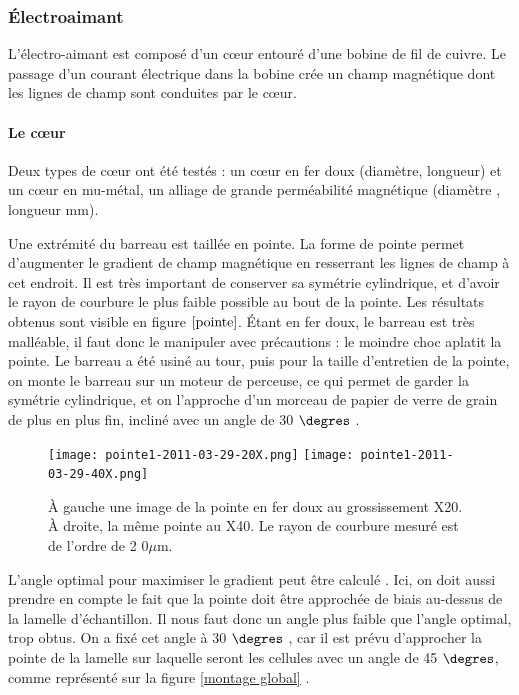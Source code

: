		\subsubsection{\'Electroaimant}
		L'électro-aimant est composé d'un c\oe ur entouré d'une bobine de fil de cuivre. Le passage d'un courant électrique dans la bobine crée un champ magnétique dont les lignes de champ sont conduites par le c\oe ur. 
		
		\paragraph{Le c\oe ur} Deux types de c\oe ur ont été testés : un c\oe ur en fer doux (diamètre, longueur) et un c\oe ur en mu-métal, un alliage de grande perméabilité magnétique (diamètre  , longueur mm).
		
		Une extrémité du barreau est taillée en pointe. La forme de pointe permet d'augmenter le gradient de champ magnétique en resserrant les lignes de champ à cet endroit. Il est très important de conserver sa symétrie cylindrique, et d'avoir le rayon de courbure le plus faible possible au bout de la pointe. Les résultats obtenus sont visible en figure $\ref{pointe}$. \'Etant en fer doux, le barreau est très malléable, il faut donc le manipuler avec précautions : le moindre choc aplatit la pointe. 
	 Le barreau a été usiné au tour, puis pour la taille d'entretien de la pointe, on monte le barreau sur un moteur de perceuse, ce qui permet de garder la symétrie cylindrique, et on l'approche d'un morceau de papier de verre de grain de plus en plus fin, incliné avec un angle de 30 $\degres$ .
	 
	 \begin{figure}[ht!]%
\texttt{[image: pointe1-2011-03-29-20X.png]}%
\texttt{[image: pointe1-2011-03-29-40X.png]}
\caption{À gauche une image de la pointe en fer doux au grossissement X20. À droite, la même pointe au X40. Le rayon de courbure mesuré est de l'ordre de 2
0$\mu$m.}%
\label{pointe}
\end{figure}
	 
	 L'angle optimal pour maximiser le gradient peut être calculé \cite{magnetisme}. Ici, on doit aussi prendre en compte le fait que la pointe doit être approchée de biais au-dessus de la lamelle d'échantillon. Il nous faut donc un angle plus faible que l'angle optimal, trop obtus. On a fixé cet angle à 30 $\degres$ , car il est prévu d'approcher la pointe de la lamelle sur laquelle seront les cellules avec un angle de 45 $\degres$, comme représenté sur la figure \ref{montage global} .

